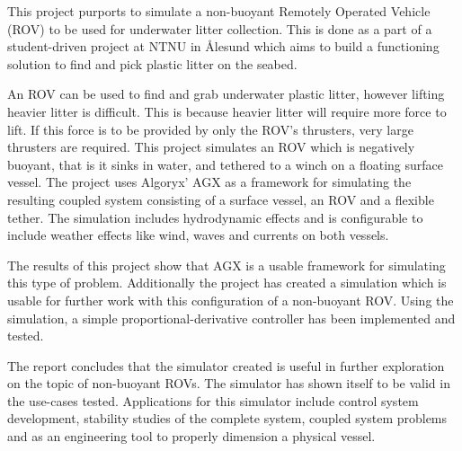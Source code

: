 This project purports to simulate a non-buoyant Remotely Operated Vehicle (ROV) to be used for underwater litter collection. This is done as a part of a student-driven project at NTNU in Ålesund which aims to build a functioning solution to find and pick plastic litter on the seabed.

An ROV can be used to find and grab underwater plastic litter, however lifting heavier litter is difficult. This is because heavier litter will require more force to lift. If this force is to be provided by only the ROV's thrusters, very large thrusters are required. This project simulates an ROV which is negatively buoyant, that is it sinks in water, and tethered to a winch on a floating surface vessel. The project uses Algoryx' AGX as a framework for simulating the resulting coupled system consisting of a surface vessel, an ROV and a flexible tether. The simulation includes hydrodynamic effects and is configurable to include weather effects like wind, waves and currents on both vessels. 

The results of this project show that AGX is a usable framework for simulating this type of problem. Additionally the project has created a simulation which is usable for further work with this configuration of a non-buoyant ROV. Using the simulation, a simple proportional-derivative controller has been implemented and tested. 

The report concludes that the simulator created is useful in further exploration on the topic of non-buoyant ROVs. The simulator has shown itself to be valid in the use-cases tested. Applications for this simulator include control system development, stability studies of the complete system, coupled system problems and as an engineering tool to properly dimension a physical vessel.









